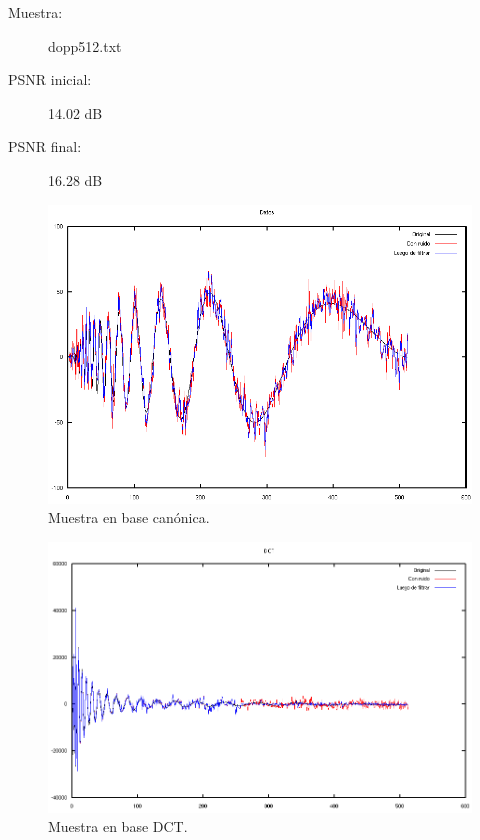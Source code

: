 \documentclass[a4paper,10pt,twoside]{article}
\begin{document}
\begin{description}
  \item[Muestra:] dopp512.txt
  \item[PSNR inicial:] 14.02 dB
  \item[PSNR final:] 16.28 dB
\end{description}

\begin{figure}[H]
  \centering
  \includegraphics[width=15cm]{graficos/dopp_aditivo_atenuar_muestra.png}
  \caption{Muestra en base canónica.}
\end{figure}

\begin{figure}[H]
  \centering
  \includegraphics[width=15cm]{graficos/dopp_aditivo_atenuar_dct.png} 
  \caption{Muestra en base DCT.}
\end{figure}
\end{document}
